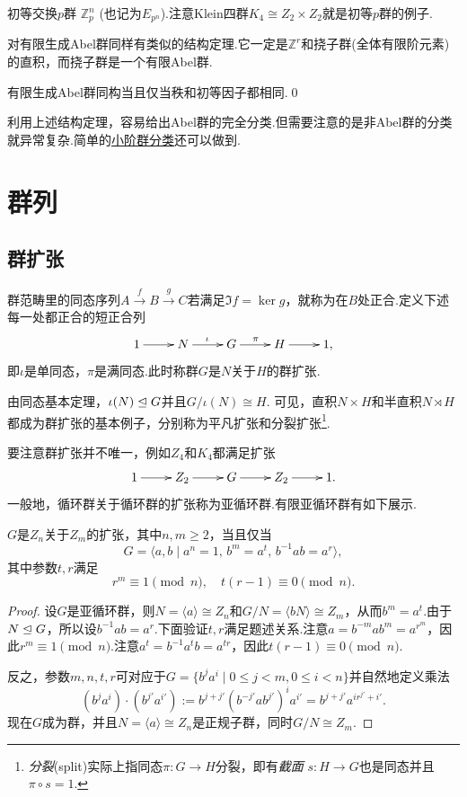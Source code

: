 {\heiti 初等交换$p$群} $\mathbb{Z}_p^n$ (也记为$E_{p^n}$).注意Klein四群$K_4\cong Z_2\times Z_2$就是初等$p$群的例子.

对有限生成Abel群同样有类似的结构定理.它一定是$\mathbb{Z}^r$和{\heiti 挠子群}(全体有限阶元素)的直积，而挠子群是一个有限Abel群.

\begin{thm}[(有限生成Abel群结构)]
	有限生成Abel群同构当且仅当秩和初等因子都相同.\qed\hypertarget{thm:StrucOfFiniteGeneratedAbelGrp}{}
\end{thm}

利用上述结构定理，容易给出Abel群的完全分类.但需要注意的是非Abel群的分类就异常复杂.简单的\hyperref[subsec:ClassificationSmallOrder]{小阶群分类}还可以做到.

\section{群列}
\subsection{群扩张}\label{subsec:GroupExtension}
群范畴里的同态序列$A\overset{f}{\to} B\overset{g}{\to} C$若满足$\Im f=\ker g$，就称为在$B$处{\heiti 正合}.定义下述每一处都正合的{\heiti 短正合列}
\[
	\xymatrix{
		1\ar[r]&N\ar[r]^\iota&G\ar[r]^\pi&H\ar[r]&1,
	}
\]
即$\iota$是单同态，$\pi$是满同态.此时称群$G$是$N$关于$H$的{\heiti 群扩张}.

由同态基本定理，$\iota(N)\trianglelefteq G$并且$G/\iota(N)\cong H$.
可见，直积$N\times H$和半直积$N\rtimes H$都成为群扩张的基本例子，分别称为{\heiti 平凡扩张}和{\heiti 分裂扩张}\footnote{\emph{分裂}(split)实际上指同态$\pi\colon G\to H$分裂，即有\emph{截面} $s\colon H\to G$也是同态并且$\pi\circ s=1$.}.

要注意群扩张并不唯一，例如$Z_4$和$K_4$都满足扩张
\[
	\xymatrix{
		1\ar[r]&Z_2\ar[r]&G\ar[r]&Z_2\ar[r]&1.
	}
\]
一般地，循环群关于循环群的扩张称为{\heiti 亚循环群}.有限亚循环群有如下展示.
\begin{thm}[(H\"older)]
	$G$是$Z_n$关于$Z_m$的扩张，其中$n,m\ge 2$，当且仅当
	\[
		G=\langle a,b\mid a^n=1,\,b^m=a^t,\,b^{-1}ab=a^r\rangle ,
	\]
	其中参数$t,r$满足\hypertarget{thm:Metacyclic}{}
	\[
		r^m\equiv 1\pmod{n},\quad t(r-1)\equiv 0\pmod{n}.
	\]
\end{thm}
\begin{proof}
	设$G$是亚循环群，则$N=\langle a\rangle\cong Z_n$和$G/N=\langle bN\rangle \cong Z_m$，从而$b^m=a^t$.由于$N\trianglelefteq G$，所以设$b^{-1}ab=a^r$.下面验证$t,r$满足题述关系.注意$a=b^{-m}ab^m=a^{r^m}$，因此$r^m\equiv 1\pmod n$.注意$a^t=b^{-1}a^tb=a^{tr}$，因此$t(r-1)\equiv 0\pmod n$.

	反之，参数$m,n,t,r$可对应于$G=\{b^ja^i\mid 0\le j<m,0\le i<n\}$并自然地定义乘法
	\[
		(b^ja^i)\cdot (b^{j'}a^{i'}):=b^{j+j'}(b^{-j'}ab^{j'})^ia^{i'}=b^{j+j'}a^{ir^{j'}+i'}.
	\]
	现在$G$成为群，并且$N=\langle a\rangle\cong Z_n$是正规子群，同时$G/N\cong Z_m$.
\end{proof}

